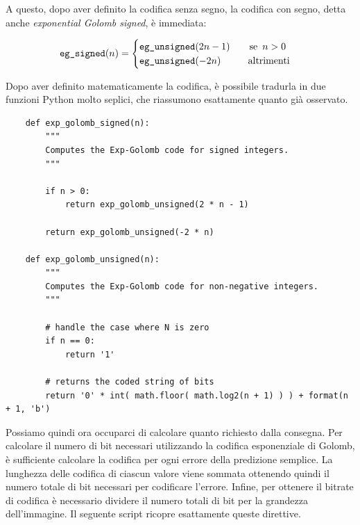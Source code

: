 \noindent A questo, dopo aver definito la codifica senza segno, la codifica con segno, detta anche \textsl{exponential Golomb signed}, è immediata:

\begin{gather*}
    \text{\texttt{eg\_signed}}(n) =
    \begin{cases}
        \text{\texttt{eg\_unsigned}}(2n - 1) \hspace{20px} \text{se } \, n > 0 \\
        \text{\texttt{eg\_unsigned}}(-2n) \hspace{28px} \text{altrimenti}
    \end{cases}
\end{gather*}

\noindent Dopo aver definito matematicamente la codifica, è possibile tradurla in due funzioni Python molto seplici, che riassumono esattamente quanto già osservato.

\begin{lstlisting}
    def exp_golomb_signed(n):
        """
        Computes the Exp-Golomb code for signed integers.
        """

        if n > 0:
            return exp_golomb_unsigned(2 * n - 1)
            
        return exp_golomb_unsigned(-2 * n)
        
    def exp_golomb_unsigned(n):
        """
        Computes the Exp-Golomb code for non-negative integers.
        """

        # handle the case where N is zero
        if n == 0:
            return '1'
        
        # returns the coded string of bits
        return '0' * int( math.floor( math.log2(n + 1) ) ) + format(n + 1, 'b')
\end{lstlisting}

\noindent Possiamo quindi ora occuparci di calcolare quanto richiesto dalla consegna. Per calcolare il numero di bit necessari utilizzando la codifica esponenziale di Golomb, è sufficiente calcolare la codifica per ogni errore della predizione semplice. La lunghezza delle codifica di ciascun valore viene sommata ottenendo quindi il numero totale di bit necessari per codificare l'errore. Infine, per ottenere il bitrate di codifica è necessario dividere il numero totali di bit per la grandezza dell'immagine. Il seguente script ricopre esattamente queste direttive.

